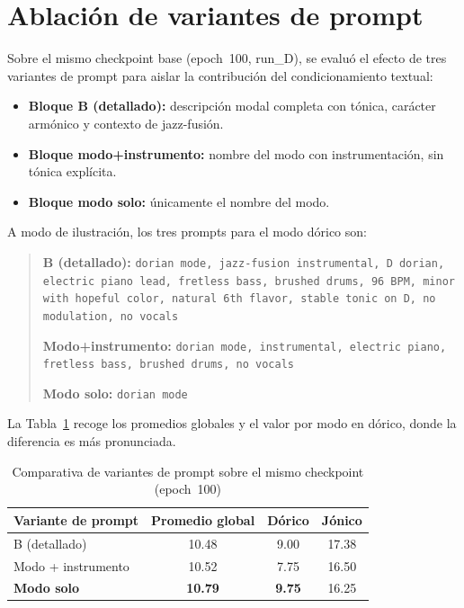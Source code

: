\documentclass[%
    school=etsisi,%
    type=pfg,%
    degree=61CD,%
]{upm-report}
\begin{document}
\section{Ablaci\'on de variantes de prompt}
\label{s:ablacion-prompts}

Sobre el mismo checkpoint base (epoch~100, run\_D), se evalu\'o el efecto de tres variantes de prompt para aislar la contribuci\'on del condicionamiento textual:

\begin{itemize}
    \item \textbf{Bloque B (detallado):} descripci\'on modal completa con t\'onica, car\'acter arm\'onico y contexto de jazz-fusi\'on.
    \item \textbf{Bloque modo+instrumento:} nombre del modo con instrumentaci\'on, sin t\'onica expl\'icita.
    \item \textbf{Bloque modo solo:} \'unicamente el nombre del modo.
\end{itemize}

A modo de ilustraci\'on, los tres prompts para el modo d\'orico son:

\begin{quote}\small
\textbf{B (detallado):} \texttt{dorian mode, jazz-fusion instrumental, D dorian, electric piano lead, fretless bass, brushed drums, 96 BPM, minor with hopeful color, natural 6th flavor, stable tonic on D, no modulation, no vocals}

\medskip
\textbf{Modo+instrumento:} \texttt{dorian mode, instrumental, electric piano, fretless bass, brushed drums, no vocals}

\medskip
\textbf{Modo solo:} \texttt{dorian mode}
\end{quote}

La Tabla~\ref{tab:ablacion-prompts} recoge los promedios globales y el valor por modo en d\'orico, donde la diferencia es m\'as pronunciada.

\begin{table}[H]
    \centering
    \caption{Comparativa de variantes de prompt sobre el mismo checkpoint (epoch~100)}
    \label{tab:ablacion-prompts}
    \begin{tabular}{lccc}
        \toprule
        \textbf{Variante de prompt} & \textbf{Promedio global} & \textbf{D\'orico} & \textbf{J\'onico} \\
        \midrule
        B (detallado)         & 10.48 & 9.00  & 17.38 \\
        Modo + instrumento    & 10.52 & 7.75  & 16.50 \\
        \textbf{Modo solo}    & \textbf{10.79} & \textbf{9.75} & 16.25 \\
        \bottomrule
    \end{tabular}
\end{table}
\end{document}
